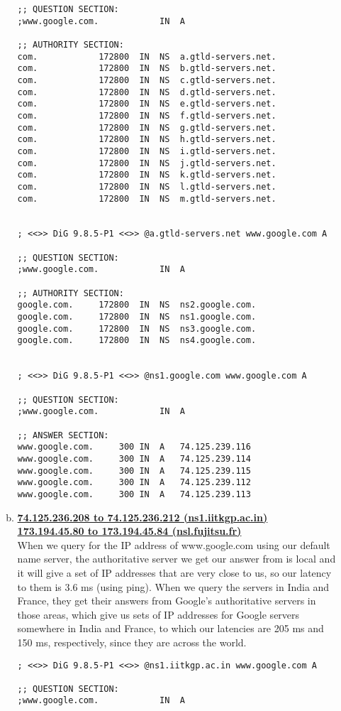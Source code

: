 \documentclass[11pt,fleqn]{article}
\begin{document}
\begin{enumerate}[Q1.]
\begin{enumerate}[(a)]
\begin{verbatim}
;; QUESTION SECTION:
;www.google.com.			IN	A

;; AUTHORITY SECTION:
com.			172800	IN	NS	a.gtld-servers.net.
com.			172800	IN	NS	b.gtld-servers.net.
com.			172800	IN	NS	c.gtld-servers.net.
com.			172800	IN	NS	d.gtld-servers.net.
com.			172800	IN	NS	e.gtld-servers.net.
com.			172800	IN	NS	f.gtld-servers.net.
com.			172800	IN	NS	g.gtld-servers.net.
com.			172800	IN	NS	h.gtld-servers.net.
com.			172800	IN	NS	i.gtld-servers.net.
com.			172800	IN	NS	j.gtld-servers.net.
com.			172800	IN	NS	k.gtld-servers.net.
com.			172800	IN	NS	l.gtld-servers.net.
com.			172800	IN	NS	m.gtld-servers.net.


; <<>> DiG 9.8.5-P1 <<>> @a.gtld-servers.net www.google.com A

;; QUESTION SECTION:
;www.google.com.			IN	A

;; AUTHORITY SECTION:
google.com.		172800	IN	NS	ns2.google.com.
google.com.		172800	IN	NS	ns1.google.com.
google.com.		172800	IN	NS	ns3.google.com.
google.com.		172800	IN	NS	ns4.google.com.


; <<>> DiG 9.8.5-P1 <<>> @ns1.google.com www.google.com A

;; QUESTION SECTION:
;www.google.com.			IN	A

;; ANSWER SECTION:
www.google.com.		300	IN	A	74.125.239.116
www.google.com.		300	IN	A	74.125.239.114
www.google.com.		300	IN	A	74.125.239.115
www.google.com.		300	IN	A	74.125.239.112
www.google.com.		300	IN	A	74.125.239.113
\end{verbatim}
\item \textbf{\underline{74.125.236.208 to 74.125.236.212 (ns1.iitkgp.ac.in)}} \\
\textbf{\underline{173.194.45.80 to 173.194.45.84 (nsl.fujitsu.fr)}} \\
When we query for the IP address of www.google.com using our default name server, the authoritative server we get our answer from is local and it will give a set of IP addresses that are very close to us, so our latency to them is 3.6 ms (using ping). When we query the servers in India and France, they get their answers from Google's authoritative servers in those areas, which give us sets of IP addresses for Google servers somewhere in India and France, to which our latencies are 205 ms and 150 ms, respectively, since they are across the world.
\begin{verbatim}
; <<>> DiG 9.8.5-P1 <<>> @ns1.iitkgp.ac.in www.google.com A

;; QUESTION SECTION:
;www.google.com.			IN	A


\end{verbatim}
\end{enumerate}
\end{enumerate}
\end{document}
